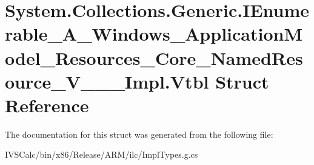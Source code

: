 \hypertarget{struct_system_1_1_collections_1_1_generic_1_1_i_enumerable___a___windows___application_model___r8a8dba558fe7f842eed0b971d6b50278}{}\section{System.\+Collections.\+Generic.\+I\+Enumerable\+\_\+\+A\+\_\+\+Windows\+\_\+\+Application\+Model\+\_\+\+Resources\+\_\+\+Core\+\_\+\+Named\+Resource\+\_\+\+V\+\_\+\+\_\+\+\_\+\+Impl.\+Vtbl Struct Reference}
\label{struct_system_1_1_collections_1_1_generic_1_1_i_enumerable___a___windows___application_model___r8a8dba558fe7f842eed0b971d6b50278}


The documentation for this struct was generated from the following file\+:\begin{DoxyCompactItemize}
\item 
I\+V\+S\+Calc/bin/x86/\+Release/\+A\+R\+M/ilc/Impl\+Types.\+g.\+cs\end{DoxyCompactItemize}
